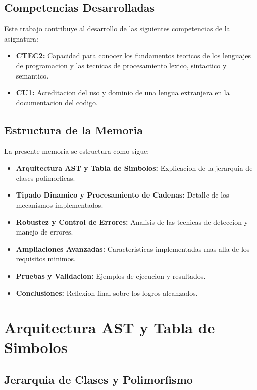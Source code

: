 \documentclass[11pt,a4paper]{article}
\begin{document}
\subsection{Competencias Desarrolladas}

Este trabajo contribuye al desarrollo de las siguientes competencias de la asignatura:

\begin{itemize}
    \item \textbf{CTEC2:} Capacidad para conocer los fundamentos teoricos de los lenguajes de programacion y las tecnicas de procesamiento lexico, sintactico y semantico.
    \item \textbf{CU1:} Acreditacion del uso y dominio de una lengua extranjera en la documentacion del codigo.
\end{itemize}

\subsection{Estructura de la Memoria}

La presente memoria se estructura como sigue:

\begin{itemize}
    \item \textbf{Arquitectura AST y Tabla de Simbolos:} Explicacion de la jerarquia de clases polimorficas.
    \item \textbf{Tipado Dinamico y Procesamiento de Cadenas:} Detalle de los mecanismos implementados.
    \item \textbf{Robustez y Control de Errores:} Analisis de las tecnicas de deteccion y manejo de errores.
    \item \textbf{Ampliaciones Avanzadas:} Caracteristicas implementadas mas alla de los requisitos minimos.
    \item \textbf{Pruebas y Validacion:} Ejemplos de ejecucion y resultados.
    \item \textbf{Conclusiones:} Reflexion final sobre los logros alcanzados.
\end{itemize}

\newpage

\section{Arquitectura AST y Tabla de Simbolos}

\subsection{Jerarquia de Clases y Polimorfismo}
\end{document}
